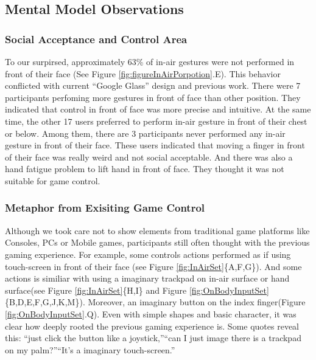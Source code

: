 \documentclass{sigchi}
\begin{document}
  \subsection{Mental Model Observations}
    \subsubsection{Social Acceptance and Control Area}
    To our surpirsed, approximately 63\% of in-air gestures were not performed in front of their face (See Figure \ref{fig:figureInAirPorpotion}.E). This behavior conflicted with current ``Google Glass'' design and previous work\cite{Colaco:2013:MCL:2501988.2502042}. There were 7 participants perfoming more gestures in front of face than other position. They indicated that control in front of face was more precise and intuitive. At the same time, the other 17 users preferred to perform in-air gesture in front of their chest or below. Among them, there are 3 participants never performed any in-air gesture in front of their face. These users indicated that moving a finger in front of their face was really weird and not social acceptable. And there was also a hand fatigue problem to lift hand in front of face. They thought it was not suitable for game control.

    \subsubsection{Metaphor from Exisiting Game Control}
    Although we took care not to show elements from traditional game platforms like Consoles, PCs or Mobile games, participants still often thought with the previous gaming experience. For example, some controls actions performed as if using touch-screen in front of their face (see Figure \ref{fig:InAirSet}\{A,F,G\}). And some actions is similiar with using a imaginary trackpad on in-air surface or hand surface(see Figure \ref{fig:InAirSet}\{H,I\} and Figure \ref{fig:OnBodyInputSet}\{B,D,E,F,G,J,K,M\}). Moreover, an imaginary button on the index finger(Figure \ref{fig:OnBodyInputSet}.Q). Even with simple shapes and basic character, it was clear how deeply rooted the previous gaming experience is. Some quotes reveal this: ``just click the button like a joystick,''``can I just image there is a trackpad on my palm?''``It's a imaginary touch-screen.''
\end{document}
